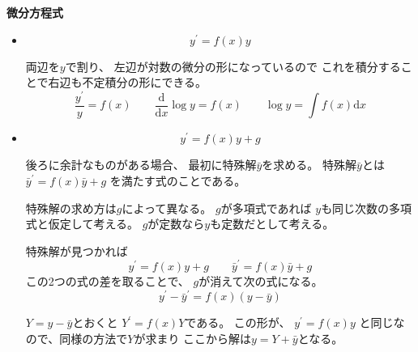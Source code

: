 \documentclass[12pt,b5paper]{ltjsarticle}
\begin{document}
\hrulefill

\textbf{微分方程式}

\begin{itemize}
 \item 
       \begin{equation}
        y^\prime = f(x)y
       \end{equation}

       両辺を$y$で割り、
       左辺が対数の微分の形になっているので
       これを積分することで右辺も不定積分の形にできる。
       \begin{equation}
        \frac{y^\prime}{y} = f(x)
         \qquad
        \frac{\mathrm{d}}{\mathrm{d}x} \log y = f(x)
         \qquad
        \log y = \int f(x) \mathrm{d}x
       \end{equation}

 \item
      \begin{equation}
       y^\prime = f(x)y + g
      \end{equation}

      後ろに余計なものがある場合、
      最初に特殊解$\bar{y}$を求める。
      特殊解$\bar{y}$とは
      $\bar{y}^\prime = f(x)\bar{y} +g$
      を満たす式のことである。

      特殊解の求め方は$g$によって異なる。
      $g$が多項式であれば
      $y$も同じ次数の多項式と仮定して考える。
      $g$が定数なら$y$も定数だとして考える。

      特殊解が見つかれば
      \begin{equation}
       y^\prime = f(x)y + g
        \qquad
        \bar{y}^\prime = f(x)\bar{y} +g
      \end{equation}
      この2つの式の差を取ることで、
      $g$が消えて次の式になる。
      \begin{equation}
       y^\prime - \bar{y}^\prime = f(x)(y - \bar{y})
      \end{equation}

      $Y=y - \bar{y}$とおくと
      $Y^\prime = f(x)Y$である。
      この形が、
      $y^\prime = f(x)y$
      と同じなので、同様の方法で$Y$が求まり
      ここから解は$y=Y+\bar{y}$となる。

\end{itemize}



\hrulefill


%
%
\end{document}
